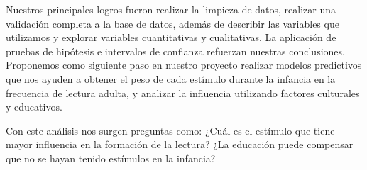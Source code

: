 \documentclass[aps,reprint]{revtex4-2}
\begin{document}
Nuestros principales logros fueron realizar la limpieza de datos, realizar una validación completa a la base de datos, además de describir las variables que utilizamos y explorar variables cuantitativas y cualitativas. La aplicación de pruebas de hipótesis e intervalos de confianza refuerzan nuestras conclusiones. Proponemos como siguiente paso en nuestro proyecto realizar modelos predictivos que nos ayuden a obtener el peso de cada estímulo durante la infancia en la frecuencia de lectura adulta, y analizar la influencia utilizando factores culturales y educativos.

Con este análisis nos surgen preguntas como: ¿Cuál es el estímulo que tiene mayor influencia en la formación de la lectura? ¿La educación puede compensar que no se hayan tenido estímulos en la infancia?

\nocite{*}


\end{document}
